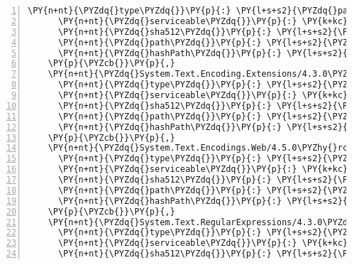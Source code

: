 \begin{Verbatim}[commandchars=\\\{\},numbers=left,firstnumber=1,stepnumber=1,numberblanklines=0]
      \PY{n+nt}{\PYZdq{}type\PYZdq{}}\PY{p}{:} \PY{l+s+s2}{\PYZdq{}package\PYZdq{}}\PY{p}{,}
      \PY{n+nt}{\PYZdq{}serviceable\PYZdq{}}\PY{p}{:} \PY{k+kc}{true}\PY{p}{,}
      \PY{n+nt}{\PYZdq{}sha512\PYZdq{}}\PY{p}{:} \PY{l+s+s2}{\PYZdq{}sha512\PYZhy{}odoLDvACxh/FlanlhcKuXhBsDqS/rWUxu4g7AK73N7FAfcF94o3UGv4tkuavvKE3YUhe8GyU+pwjrVzOaVm3Gw==\PYZdq{}}\PY{p}{,}
      \PY{n+nt}{\PYZdq{}path\PYZdq{}}\PY{p}{:} \PY{l+s+s2}{\PYZdq{}system.text.encoding.codepages/4.5.0\PYZhy{}rc1\PYZdq{}}\PY{p}{,}
      \PY{n+nt}{\PYZdq{}hashPath\PYZdq{}}\PY{p}{:} \PY{l+s+s2}{\PYZdq{}system.text.encoding.codepages.4.5.0\PYZhy{}rc1.nupkg.sha512\PYZdq{}}
    \PY{p}{\PYZcb{}}\PY{p}{,}
    \PY{n+nt}{\PYZdq{}System.Text.Encoding.Extensions/4.3.0\PYZdq{}}\PY{p}{:} \PY{p}{\PYZob{}}
      \PY{n+nt}{\PYZdq{}type\PYZdq{}}\PY{p}{:} \PY{l+s+s2}{\PYZdq{}package\PYZdq{}}\PY{p}{,}
      \PY{n+nt}{\PYZdq{}serviceable\PYZdq{}}\PY{p}{:} \PY{k+kc}{true}\PY{p}{,}
      \PY{n+nt}{\PYZdq{}sha512\PYZdq{}}\PY{p}{:} \PY{l+s+s2}{\PYZdq{}sha512\PYZhy{}YVMK0Bt/A43RmwizJoZ22ei2nmrhobgeiYwFzC4YAN+nue8RF6djXDMog0UCn+brerQoYVyaS+ghy9P/MUVcmw==\PYZdq{}}\PY{p}{,}
      \PY{n+nt}{\PYZdq{}path\PYZdq{}}\PY{p}{:} \PY{l+s+s2}{\PYZdq{}system.text.encoding.extensions/4.3.0\PYZdq{}}\PY{p}{,}
      \PY{n+nt}{\PYZdq{}hashPath\PYZdq{}}\PY{p}{:} \PY{l+s+s2}{\PYZdq{}system.text.encoding.extensions.4.3.0.nupkg.sha512\PYZdq{}}
    \PY{p}{\PYZcb{}}\PY{p}{,}
    \PY{n+nt}{\PYZdq{}System.Text.Encodings.Web/4.5.0\PYZhy{}rc1\PYZdq{}}\PY{p}{:} \PY{p}{\PYZob{}}
      \PY{n+nt}{\PYZdq{}type\PYZdq{}}\PY{p}{:} \PY{l+s+s2}{\PYZdq{}package\PYZdq{}}\PY{p}{,}
      \PY{n+nt}{\PYZdq{}serviceable\PYZdq{}}\PY{p}{:} \PY{k+kc}{true}\PY{p}{,}
      \PY{n+nt}{\PYZdq{}sha512\PYZdq{}}\PY{p}{:} \PY{l+s+s2}{\PYZdq{}sha512\PYZhy{}ETjz7/b6DLsCLr9mqsmgUQ6BhBlRJ3cyjey/33bL9a4bqTtOyNtReLJmXBTOi1Fq3epeZ1Bx0qk4sLbpPqCyfQ==\PYZdq{}}\PY{p}{,}
      \PY{n+nt}{\PYZdq{}path\PYZdq{}}\PY{p}{:} \PY{l+s+s2}{\PYZdq{}system.text.encodings.web/4.5.0\PYZhy{}rc1\PYZdq{}}\PY{p}{,}
      \PY{n+nt}{\PYZdq{}hashPath\PYZdq{}}\PY{p}{:} \PY{l+s+s2}{\PYZdq{}system.text.encodings.web.4.5.0\PYZhy{}rc1.nupkg.sha512\PYZdq{}}
    \PY{p}{\PYZcb{}}\PY{p}{,}
    \PY{n+nt}{\PYZdq{}System.Text.RegularExpressions/4.3.0\PYZdq{}}\PY{p}{:} \PY{p}{\PYZob{}}
      \PY{n+nt}{\PYZdq{}type\PYZdq{}}\PY{p}{:} \PY{l+s+s2}{\PYZdq{}package\PYZdq{}}\PY{p}{,}
      \PY{n+nt}{\PYZdq{}serviceable\PYZdq{}}\PY{p}{:} \PY{k+kc}{true}\PY{p}{,}
      \PY{n+nt}{\PYZdq{}sha512\PYZdq{}}\PY{p}{:} \PY{l+s+s2}{\PYZdq{}sha512\PYZhy{}RpT2DA+L660cBt1FssIE9CAGpLFdFPuheB7pLpKpn6ZXNby7jDERe8Ua/Ne2xGiwLVG2JOqziiaVCGDon5sKFA==\PYZdq{}}\PY{p}{,}

\end{Verbatim}
